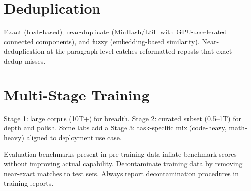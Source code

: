 \section{Deduplication}

Exact (hash-based), near-duplicate (MinHash/LSH with GPU-accelerated connected components), and fuzzy (embedding-based similarity). Near-deduplication at the paragraph level catches reformatted reposts that exact dedup misses.

\section{Multi-Stage Training}

Stage 1: large corpus (10T+) for breadth. Stage 2: curated subset (0.5--1T) for depth and polish. Some labs add a Stage 3: task-specific mix (code-heavy, math-heavy) aligned to deployment use case.

\begin{warningbox}
Evaluation benchmarks present in pre-training data inflate benchmark scores without improving actual capability. Decontaminate training data by removing near-exact matches to test sets. Always report decontamination procedures in training reports.
\end{warningbox}
